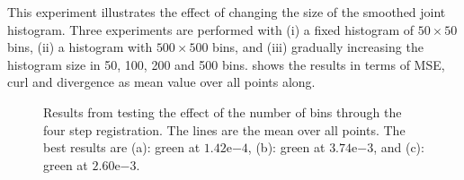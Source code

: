 \documentclass[twocolumn]{svjour3}
\begin{document}
This experiment illustrates the effect of changing the size of the smoothed joint
histogram. Three experiments are performed with (i) a fixed histogram of $50\times50$
bins, (ii) a histogram with $500\times500$ bins, and (iii) gradually increasing the
histogram size in 50, 100, 200 and 500 bins.  shows the results in
terms of MSE, curl and divergence as mean value over all points along.
\begin{figure}[!htb]
  \centering
  \hspace*{0cm}
  \hspace*{0cm}
  \caption{Results from testing the effect of the number of bins through the four step
    registration. The lines are the mean over all points. The best results are (a): green
    at $1.42\mathrm{e}{-4}$, (b): green at $3.74\mathrm{e}{-3}$, and (c): green at
    $2.60\mathrm{e}{-3}$.}
  \label{fig:binstest}
\end{figure}
\end{document}
